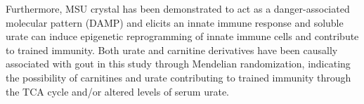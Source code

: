 \documentclass[a4paper,10pt]{article}
\begin{document}
Furthermore, MSU crystal has been demonstrated to act as a danger-associated molecular pattern (DAMP) and elicits an innate immune response and soluble urate can induce epigenetic reprogramming of innate immune cells and contribute to trained immunity\citep{badii_urate-induced_2021,cabau_urate-induced_2020}.
Both urate and carnitine derivatives have been causally associated with gout in this study through Mendelian randomization, indicating the possibility of carnitines and urate contributing to trained immunity through the TCA cycle and/or altered levels of serum urate.
\\

\end{document}
